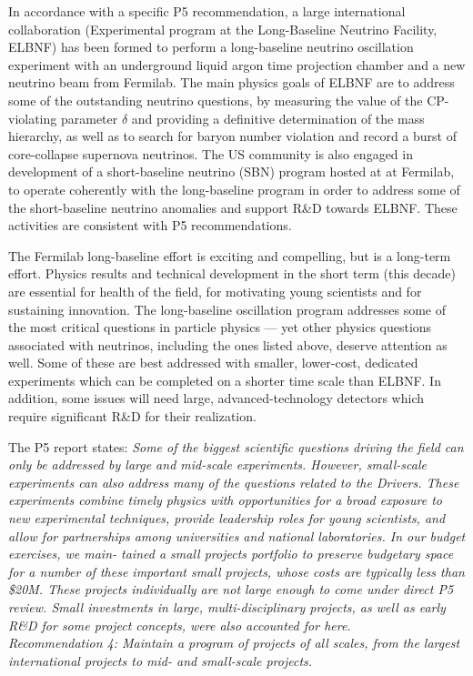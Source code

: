 In accordance with a specific P5 recommendation, a large international
collaboration (Experimental program at the Long-Baseline Neutrino
Facility, ELBNF) has been formed to perform a long-baseline neutrino
oscillation experiment with an underground liquid argon time
projection chamber and a new neutrino beam from
Fermilab.  The main physics goals of ELBNF are to address some of the
outstanding neutrino questions, by measuring the value of
the CP-violating parameter $\delta$ and providing a definitive
determination of the mass hierarchy, as well as to search for baryon
number violation and record a burst of core-collapse supernova
neutrinos.  The US community is also engaged in development of a
short-baseline neutrino (SBN) program hosted at at Fermilab, to operate
coherently with the long-baseline program in order to address some of the 
short-baseline neutrino anomalies and support R\&D towards ELBNF. 
These activities are consistent with P5 recommendations.

The Fermilab long-baseline effort is exciting and compelling, but
is a long-term effort.  Physics results and technical development in
the short term (this decade) are essential for health of the field,
for motivating young scientists and for sustaining innovation.  The
long-baseline oscillation program addresses some of the most critical
questions in particle physics --- yet other physics questions
associated with neutrinos, including the ones listed above, deserve
attention as well.  Some of these are best addressed with smaller,
lower-cost, dedicated experiments which can be completed
on a shorter time scale than ELBNF.  In addition, some issues will
need large, advanced-technology detectors which require
significant R\&D for their realization.

The P5 report states:
\textit{Some of the biggest scientific questions driving the field can only be
addressed by large and mid-scale experiments. However, small-scale
experiments can also address many of the questions related to the
Drivers. These experiments combine timely physics with opportunities
for a broad exposure to new experimental techniques, provide
leadership roles for young scientists, and allow for partnerships
among universities and national laboratories. In our budget exercises,
we main- tained a small projects portfolio to preserve budgetary space
for a number of these important small projects, whose costs are
typically less than \$20M. These projects individually are not large
enough to come under direct P5 review. Small investments in large,
multi-disciplinary projects, as well as early R\&D for some project
concepts, were also accounted for here.}\\
\textit{{Recommendation 4: Maintain a program of projects of all
  scales, from the largest international projects to mid- and
  small-scale projects.}}



